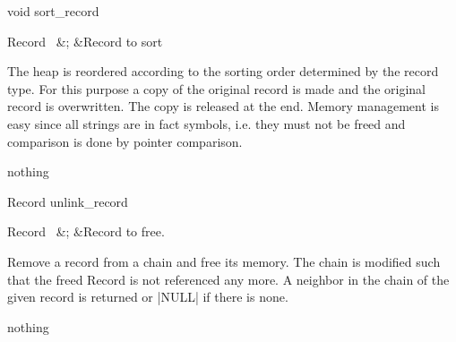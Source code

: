 \begin{Function}{void }{sort\_record}
  \begin{Arguments}
    Record \ 	&;	&Record to sort
  \end{Arguments}%
  The heap is reordered according to the sorting order
  determined by the record type.
  For this purpose a copy of the original record is made and the
  original record is overwritten. The copy is released at the
  end.
  Memory management is easy since all strings are in fact
  symbols, i.e. they must not be freed and comparison is done
  by pointer comparison.
  \begin{Result}
    nothing
  \end{Result}
\end{Function}
\begin{Function}{Record }{unlink\_record}
  \begin{Arguments}
    Record \ 	&;	&Record to free.
  \end{Arguments}%
  Remove a record from a chain and free its memory. The
  chain is modified such that the freed Record is not
  referenced any more. A neighbor in the chain of the
  given record is returned or |NULL| if there is none.
  \begin{Result}
    nothing
  \end{Result}
\end{Function}




